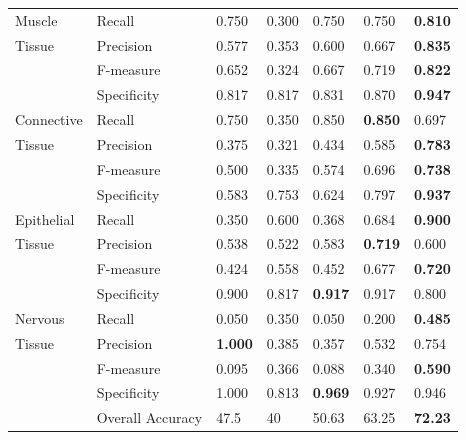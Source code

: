 \begin{table}[t]
{\begin{tabular}{|p{0.5in}|p{0.9in}|p{0.55in}|p{0.55in}|p{0.55in}|p{0.65in}|p{0.6in}|}
Muscle     &    Recall    &    0.750    &    0.300    &    0.750    &    0.750    &\textbf{    0.810    }\\
Tissue    &    Precision    &    0.577    &    0.353    &    0.600    &    0.667    &\textbf{    0.835    }\\
    &    F-measure    &    0.652    &    0.324    &    0.667    &    0.719    &\textbf{    0.822    }\\
    &    Specificity    &    0.817    &    0.817    &    0.831    &    0.870    &\textbf{    0.947    }\\
\hline
Connective     &    Recall    &    0.750    &    0.350    &    0.850    &\textbf{    0.850    }&    0.697    \\
Tissue    &    Precision    &    0.375    &    0.321    &    0.434    &    0.585    &\textbf{    0.783    }\\
    &    F-measure    &    0.500    &    0.335    &    0.574    &    0.696    &\textbf{    0.738    }\\
    &    Specificity    &    0.583    &    0.753    &    0.624    &    0.797    &\textbf{    0.937    }\\
\hline
Epithelial     &    Recall    &    0.350    &    0.600    &    0.368    &    0.684    &\textbf{    0.900    }\\
Tissue    &    Precision    &    0.538    &    0.522    &    0.583    &\textbf{    0.719    }&    0.600    \\
    &    F-measure    &    0.424    &    0.558    &    0.452    &    0.677    &\textbf{    0.720    }\\
    &    Specificity    &    0.900    &    0.817    &\textbf{    0.917    }&    0.917    &    0.800    \\
\hline
Nervous     &    Recall    &    0.050    &    0.350    &    0.050    &    0.200    &\textbf{    0.485    }\\
Tissue    &    Precision    &\textbf{    1.000    }&    0.385    &    0.357    &    0.532    &    0.754    \\
    &    F-measure    &    0.095    &    0.366    &    0.088    &    0.340    &\textbf{    0.590    }\\
    &    Specificity    &    1.000    &    0.813    &\textbf{    0.969    }&    0.927    &    0.946    \\
    &    Overall Accuracy    &    47.5    &    40    &    50.63    &    63.25    &\textbf{    72.23    }\\

\hline
 \end{tabular}}
\end{table}


